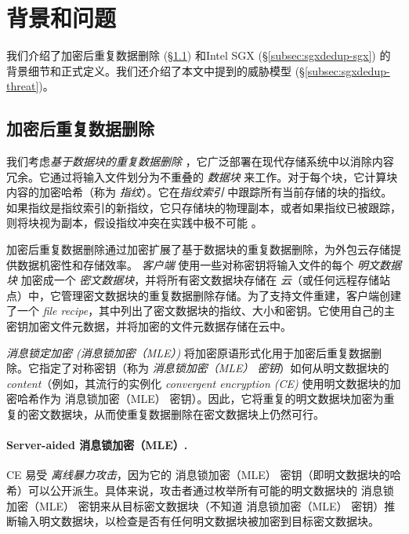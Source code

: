 \section{背景和问题}
\label{sec:sgxdedup-background}

我们介绍了加密后重复数据删除 (\S\ref{subsec:sgxdedup-encrypted-dedup}) 和Intel SGX (\S\ref{subsec:sgxdedup-sgx}) 的背景细节和正式定义。我们还介绍了本文中提到的威胁模型 (\S\ref{subsec:sgxdedup-threat})。

\subsection{加密后重复数据删除}
\label{subsec:sgxdedup-encrypted-dedup}

{\bf } 我们考虑\textit{基于数据块的重复数据删除} \cite{zhu2008avoiding,wallace12,meyer11}，它广泛部署在现代存储系统中以消除内容冗余。它通过将输入文件划分为不重叠的 \textit{数据块} 来工作。对于每个块，它计算块内容的加密哈希（称为 \textit{指纹}）。它在\textit{指纹索引} 中跟踪所有当前存储的块的指纹。如果指纹是指纹索引的新指纹，它只存储块的物理副本，或者如果指纹已被跟踪，则将块视为副本，假设指纹冲突在实践中极不可能 \cite{black06}。
   
加密后重复数据删除通过加密扩展了基于数据块的重复数据删除，为外包云存储提供数据机密性和存储效率。 \textit{ 客户端} 使用一些对称密钥将输入文件的每个 \textit{ 明文数据块} 加密成一个 \textit{ 密文数据块}，并将所有密文数据块存储在 \textit{ 云}（或任何远程存储站点）中，它管理密文数据块的重复数据删除存储。为了支持文件重建，客户端创建了一个 \textit{ file recipe}，其中列出了密文数据块的指纹、大小和密钥。它使用自己的主密钥加密文件元数据，并将加密的文件元数据存储在云中。

\textit{ 消息锁定加密 (消息锁加密（MLE）)} \cite{bellare2013MLE} 将加密原语形式化用于加密后重复数据删除。它指定了对称密钥（称为 \textit{ 消息锁加密（MLE） 密钥}）如何从明文数据块的 \textit{ content}（例如，其流行的实例化 \textit{ convergent encryption (CE)} \cite{douceur02}使用明文数据块的加密哈希作为 消息锁加密（MLE） 密钥）。因此，它将重复的明文数据块加密为重复的密文数据块，从而使重复数据删除在密文数据块上仍然可行。

\paragraph*{Server-aided 消息锁加密（MLE）.} CE 易受 \textit{ 离线暴力攻击}，因为它的 消息锁加密（MLE） 密钥（即明文数据块的哈希）可以公开派生。具体来说，攻击者通过枚举所有可能的明文数据块的 消息锁加密（MLE） 密钥来从目标密文数据块（不知道 消息锁加密（MLE） 密钥）推断输入明文数据块，以检查是否有任何明文数据块被加密到目标密文数据块。


